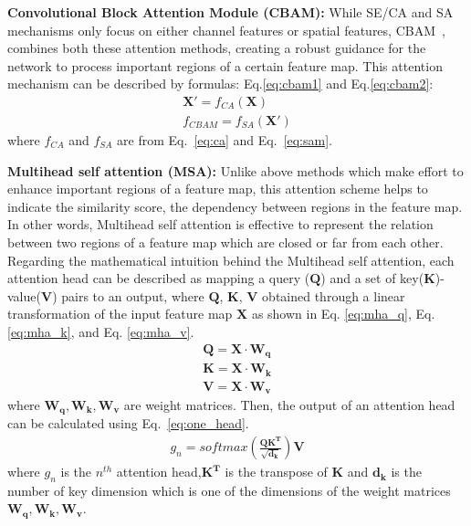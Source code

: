 \documentclass[sigconf]{acmart}
\begin{document}
\textbf{Convolutional Block Attention Module (CBAM):} While SE/CA and SA mechanisms only focus on either channel features or spatial features, CBAM~\cite{woo2018cbam}, combines both these attention methods, creating a robust guidance for the network to process important regions of a certain feature map.
This attention mechanism can be described by formulas: Eq.\ref{eq:cbam1} and Eq.\ref{eq:cbam2}:
\begin{align}
   \label{eq:cbam1}
   \mathbf{X'} =  f_{CA}(\mathbf{X}) \\
   \label{eq:cbam2}
   f_{CBAM} =  f_{SA}(\mathbf{X'}) 
\end{align}
where $f_{CA}$ and $f_{SA}$ are from Eq.~\ref{eq:ca} and Eq.~\ref{eq:sam}.

\textbf{Multihead self attention (MSA):} Unlike above methods which make effort to enhance important regions of a feature map, this attention scheme \cite{vaswani2017attention} helps to indicate the similarity score, the dependency between regions in the feature map.
In other words, Multihead self attention is effective to represent the relation between two regions of a feature map which are closed or far from each other. 
Regarding the mathematical intuition behind the Multihead self attention, each attention head can be described as mapping a query ($\mathbf{Q}$) and a set of key($\mathbf{K}$)-value($\mathbf{V}$) pairs to an output, where $\mathbf{Q}$, $\mathbf{K}$, $\mathbf{V}$ obtained through a linear transformation of the input feature map $\mathbf{X}$ as shown in Eq. \ref{eq:mha_q}, Eq. \ref{eq:mha_k}, and Eq. \ref{eq:mha_v}.
\begin{align}
   \label{eq:mha_q}
   \mathbf{Q} =  \mathbf{X} \cdot \mathbf{W_{q}} \\
   \label{eq:mha_k}
   \mathbf{K} =  \mathbf{X} \cdot \mathbf{W_{k}} \\
   \label{eq:mha_v}
   \mathbf{V} =  \mathbf{X} \cdot \mathbf{W_{v}} 
\end{align}
where  $\mathbf{W_{q}, W_{k}, W_{v}}$ are weight matrices.
Then, the output of an attention head can be calculated using Eq.~\ref{eq:one_head}. 
\begin{align}
   g_{n} =  softmax(\frac{\mathbf{Q}\mathbf{K^{T}}}{\sqrt{\mathbf{d_{k}}}})\mathbf{V} 
  \label{eq:one_head}
\end{align}
where $g_{n}$ is the $n^{th}$ attention head,$\mathbf{K^{T}}$ is the transpose of $\mathbf{K}$ and $\mathbf{d_{k}}$ is the number of key dimension which is one of the dimensions of the weight matrices $\mathbf{W_{q}, W_{k}, W_{v}}$.
\end{document}
